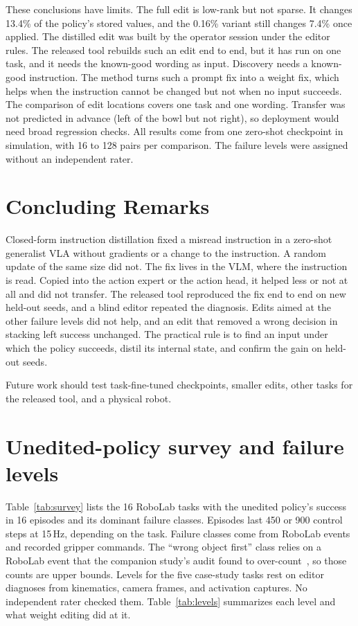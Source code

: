 \documentclass{article}
\begin{document}
These conclusions have limits. The full edit is low-rank but not sparse. It changes 13.4\% of the policy's stored values, and the 0.16\% variant still changes 7.4\% once applied. The distilled edit was built by the operator session under the editor rules. The released tool rebuilds such an edit end to end, but it has run on one task, and it needs the known-good wording as input. Discovery needs a known-good instruction. The method turns such a prompt fix into a weight fix, which helps when the instruction cannot be changed but not when no input succeeds. The comparison of edit locations covers one task and one wording. Transfer was not predicted in advance (left of the bowl but not right), so deployment would need broad regression checks. All results come from one zero-shot checkpoint in simulation, with 16 to 128 pairs per comparison. The failure levels were assigned without an independent rater.

\section{Concluding Remarks}
Closed-form instruction distillation fixed a misread instruction in a zero-shot generalist VLA without gradients or a change to the instruction. A random update of the same size did not. The fix lives in the VLM, where the instruction is read. Copied into the action expert or the action head, it helped less or not at all and did not transfer. The released tool reproduced the fix end to end on new held-out seeds, and a blind editor repeated the diagnosis. Edits aimed at the other failure levels did not help, and an edit that removed a wrong decision in stacking left success unchanged. The practical rule is to find an input under which the policy succeeds, distil its internal state, and confirm the gain on held-out seeds.

Future work should test task-fine-tuned checkpoints, smaller edits, other tasks for the released tool, and a physical robot.

\clearpage

\clearpage
\appendix

\setlength{\parskip}{5.5pt}
\section{Unedited-policy survey and failure levels}
\label{app:survey}
Table~\ref{tab:survey} lists the 16 RoboLab tasks with the unedited policy's success in 16 episodes and its dominant failure classes. Episodes last 450 or 900 control steps at 15\,Hz, depending on the task. Failure classes come from RoboLab events and recorded gripper commands. The ``wrong object first'' class relies on a RoboLab event that the companion study's audit found to over-count~\citep{abbas2026wspstudy}, so those counts are upper bounds. Levels for the five case-study tasks rest on editor diagnoses from kinematics, camera frames, and activation captures. No independent rater checked them. Table~\ref{tab:levels} summarizes each level and what weight editing did at it.
\end{document}
